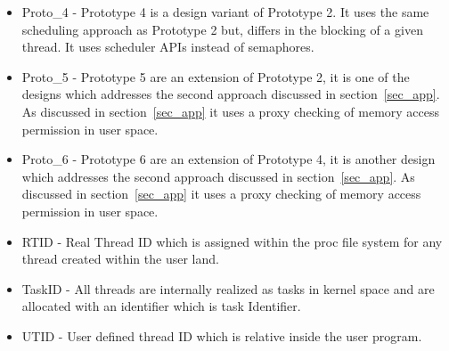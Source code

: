 \begin{itemize}
\item {Proto\_4} - Prototype 4 is a design variant of Prototype 2. It uses the same scheduling approach as Prototype 2 but, differs in the blocking of a given thread. 
It uses scheduler APIs instead of semaphores. 
\item {Proto\_5} - Prototype 5 are an extension of Prototype 2, it is one of the designs which addresses the second approach discussed in section~\ref{sec_app}. 
As discussed in section~\ref{sec_app} it uses a proxy checking of memory access permission in user space.
\item {Proto\_6} - Prototype 6 are an extension of Prototype 4, it is another design which addresses the second approach discussed in section~\ref{sec_app}. 
As discussed in section~\ref{sec_app} it uses a proxy checking of memory access permission in user space.
\item RTID - Real Thread ID which is assigned within the proc file system for any thread created within the user land. 
\item TaskID - All threads are internally realized as tasks in kernel space and are allocated with an identifier which is task Identifier.
\item UTID - User defined thread ID which is relative inside the user program.
\end{itemize}
